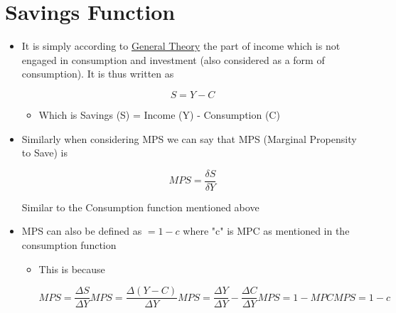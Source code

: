 \documentclass[11pt]{article}
\begin{document}
\section{Savings Function}
\label{sec:orgcbe4f8d}
\begin{itemize}
\item It is simply according to \href{General Theory Kenyes.org}{General Theory} the part of income which is not engaged in consumption and investment (also considered as a form of consumption). It is thus written as

$$
  S = Y - C
  $$

\begin{itemize}
\item Which is Savings (S) = Income (Y) - Consumption (C)
\end{itemize}

\item Similarly when considering MPS we can say that MPS (Marginal Propensity to Save) is

$$
  MPS = \frac{\delta S}{\delta Y}
  $$

Similar to the Consumption function mentioned above

\item MPS can also be defined as \(= 1 - c\) where "c" is MPC as mentioned in the consumption function
\begin{itemize}
\item This is because

$$
    MPS = \frac{\Delta S}{\Delta Y}
    MPS = \frac{\Delta (Y - C)}{\Delta Y}
    MPS = \frac{\Delta Y}{\Delta Y} - \frac{\Delta C}{\Delta Y}
    MPS = 1 - MPC
    MPS = 1 - c
    $$
\end{itemize}
\end{itemize}
\end{document}
